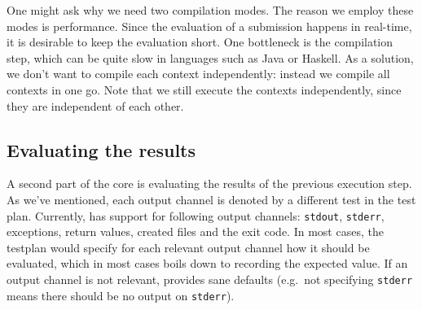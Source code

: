 \documentclass[5p,number]{elsarticle}
\begin{document}
    One might ask why we need two compilation modes.
    The reason we employ these modes is performance.
    Since the evaluation of a submission happens in real-time, it is desirable to keep the evaluation short.
    One bottleneck is the compilation step, which can be quite slow in languages such as Java or Haskell.
    As a solution, we don't want to compile each context independently: instead we compile all contexts in one go.
    Note that we still execute the contexts independently, since they are independent of each other.

    \subsection{Evaluating the results}\label{subsec:evaluating-the-results}
    
    A second part of the core is evaluating the results of the previous execution step.
    As we've mentioned, each output channel is denoted by a different test in the test plan.
    Currently, \tested{} has support for following output channels: \texttt{stdout}, \texttt{stderr}, exceptions, return values, created files and the exit code.
    In most cases, the testplan would specify for each relevant output channel how it should be evaluated, which in most cases boils down to recording the expected value.
    If an output channel is not relevant, \tested{} provides sane defaults (e.g.\ not specifying \texttt{stderr} means there should be no output on \texttt{stderr}).
\end{document}
